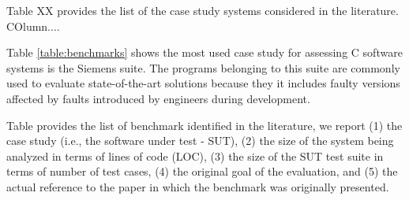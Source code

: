 




Table XX provides the list of the case study systems considered in the literature. COlumn....


Table \ref{table:benchmarks} shows the most used case study for assessing C software systems is the Siemens suite.
The programs belonging to this suite are commonly used to evaluate state-of-the-art solutions because they it includes faulty versions affected by faults introduced by engineers during development.


Table provides the list of benchmark identified in the literature, we report (1) the case study (i.e., the software under test - SUT), (2) the size of the system being analyzed in terms of lines of code (LOC), (3) the size of the SUT test suite in terms of number of test cases, (4) the original goal of the evaluation, and (5) the actual reference to the paper in which the benchmark was originally presented. 

